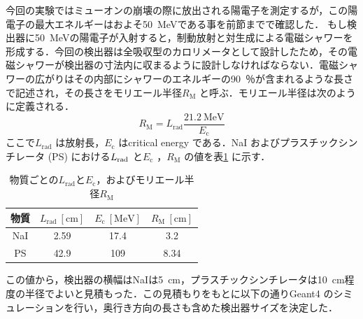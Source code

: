 今回の実験ではミューオンの崩壊の際に放出される陽電子を測定するが，この陽電子の最大エネルギーはおよそ50~MeVである事を前節までで確認した．
もし検出器に50~MeVの陽電子が入射すると，制動放射と対生成による電磁シャワーを形成する．今回の検出器は全吸収型のカロリメータとして設計したため，その電磁シャワーが検出器の寸法内に収まるように設計しなければならない．電磁シャワーの広がりはその内部にシャワーのエネルギーの90~％が含まれるような長さで記述され，その長さをモリエール半径$R_\mathrm{M}$ と呼ぶ．モリエール半径は次のように定義される．
\begin{equation}
R_\mathrm{M} = L_\mathrm{rad}\frac{21.2~\mathrm{MeV}}{E_\mathrm{c}}
\end{equation}
ここで$L_\mathrm{rad}$ は放射長，$E_\mathrm{c}$ はcritical energy である．NaI およびプラスチックシンチレータ (PS) における$L_{\rm rad}$ と$E_\mathrm{c}$ ，$R_\mathrm{M}$ の値を表\ref{tab:abe_rm} に示す．
\begin{table}[thb]
\centering
\caption{物質ごとの$L_\mathrm{rad}$と$E_\mathrm{c}$，およびモリエール半径$R_\mathrm{M}$}
\begin{tabular}{cccc}\toprule
物質 & $L_\mathrm{rad}~[\mathrm{cm}]$ & $E_\mathrm{c}~[\mathrm{MeV}]$ & $R_\mathrm{M}~[\mathrm{cm}]$ \\ \midrule
NaI & 2.59 & 17.4 & 3.2 \\
PS & 42.9 & 109 & 8.34 \\ \bottomrule
\end{tabular}
\label{tab:abe_rm}
\end{table}
この値から，検出器の横幅はNaIは5~cm，プラスチックシンチレータは10~cm程度の半径でよいと見積もった．この見積もりをもとに以下の通りGeant4 のシミュレーションを行い，奥行き方向の長さも含めた検出器サイズを決定した．

